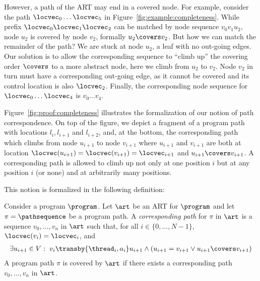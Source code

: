 \documentclass[conference]{IEEEtran}
\begin{document}
However, a path of the ART may end in a covered node.
For example, consider the path $\locvec_0 \ldots \locvec_5$ in Figure~\ref{fig:example:completeness}.
While prefix $\locvec_0 \locvec_1 \locvec_2$ can be matched by node sequence $v_0 v_1 u_2$,
node $u_2$ is covered by node $v_2$, formally $u_2 \covers v_2$.
But how we can match the remainder of the path?
We are stuck at node $u_2$, a leaf with no out-going edges.
Our solution is to allow the 
corresponding sequence to ``climb up'' the covering order 
$\covers$ to a more abstract node, here we climb from $u_2$ to $v_2$.
Node $v_2$ in turn must have a corresponding out-going edge,
as it cannot be covered and its control location is also $\locvec_2$.
Finally, the corresponding node sequence for $\locvec_0 \ldots \locvec_4$ is $v_0 \ldots v_4$.

Figure~\ref{fig:proof:completeness} illustrates the formalization of
our notion of path correspondence.
On top of the figure, we depict a fragment of a program path with locations $l_i, l_{i+1}$ and $l_{i+2}$,
and, at the bottom, the corresponding path which climbs from node
$u_{i+1}$ to node $v_{i+1}$ where $u_{i+1}$ and $v_{i+1}$ are both
at location \mbox{$\locvec(u_{i+1}) = \locvec(v_{i+1})=\locvec_{i+1}$}
and $u_{i+1} \covers v_{i+1}$.
A corresponding path is allowed to climb up not only at one position
$i$ but at any position $i$ (or none) and at arbitrarily many positions.

This notion is formalized in the following definition:
%
\begin{center}
\begin{define}
  \label{def:pathcover}
  Consider a program $\program$.  Let $\art$ be an ART for $\program$ and let
  $\pi=\pathsequence$ be a program path.  A \emph{corresponding path} for
  $\pi$ in $\art$ is a sequence $v_0,\ldots,v_n$ in $\art$ such that, for all
  $i\in\{0,\ldots,N-1\}$, $\locvec(v_i) = \locvec_i$, and
  \begin{align*}
    \exists u_{i+1} \in V:\ v_i \transby{\thread_i, a_i} u_{i+1} \wedge (u_{i+1}=v_{i+1} \vee u_{i+1} \covers v_{i+1})
  \end{align*}
  A program path $\pi$ is covered by $\art$ if there exists a corresponding path $v_0,\ldots,v_n$ in $\art$.
\end{define}
\end{center}
\end{document}
